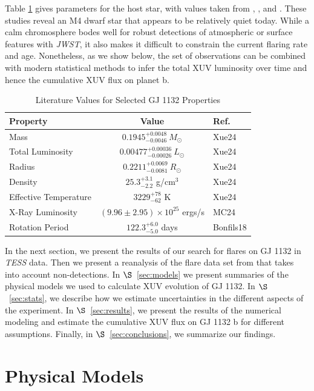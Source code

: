 \documentclass[preprint]{aastex631}
\def\tess{{\it TESS}\xspace}
\def\jwst{{\it JWST}\xspace}
\def\msun{{M_\odot}}
\def\rsun{{R_\odot}}
\def\lsun{{L_\odot}}
\begin{document}
Table \ref{tab:starprops} gives parameters for the host star, with values taken from \citep[][hereafter Xue24]{Xue2024}, \citep[][hereafter MC24]{MoralesCalderon2024}, and \citep[][hereafter Bonfils18]{Bonfils2018}. These studies reveal an M4 dwarf star that appears to be relatively quiet today. While a calm chromosphere bodes well for robust detections of atmospheric or surface features with \jwst, it also makes it difficult to constrain the current flaring rate and age. Nonetheless, as we show below, the set of observations can be combined with modern statistical methods to infer the total XUV luminosity over time and hence the cumulative XUV flux on planet b.

\begin{table}
\centering
\caption{Literature Values for Selected GJ 1132 Properties}
\begin{tabular}{lcl}
\hline\hline
Property & Value & Ref.\\
\hline
Mass & $0.1945^{+0.0048}_{-0.0046}~\msun$ & Xue24\\
Total Luminosity & $0.00477^{+0.00036}_{-0.00026}~\lsun$ & Xue24\\
Radius & $0.2211^{+0.0069}_{-0.0081}~\rsun$ & Xue24\\
Density & $25.3^{+3.1}_{-2.2}$ g/cm$^3$ & Xue24\\
Effective Temperature & $3229^{+78}_{-62}$ K & Xue24\\
X-Ray Luminosity & $(9.96\pm2.95) \times 10^{25}$ ergs/s & MC24\\
Rotation Period & $122.3^{+6.0}_{-5.0}$ days & Bonfils18\\
\hline
\end{tabular}
\label{tab:starprops}
\end{table}

In the next section, we present the results of our search for flares on GJ 1132 in \tess data. Then we present a reanalysis of the flare data set from \citep{Davenport19} that takes into account non-detections.  In $\S$~\ref{sec:models} we present summaries of the physical models we used to calculate XUV evolution of GJ 1132. In $\S$~\ref{sec:stats}, we describe how we estimate uncertainties in the different aspects of the experiment. In $\S$~\ref{sec:results}, we present the results of the numerical modeling and estimate the cumulative XUV flux on GJ 1132 b for different assumptions. Finally, in $\S$~\ref{sec:conclusions}, we summarize our findings.


\section{Physical Models\label{sec:models}}
\end{document}
